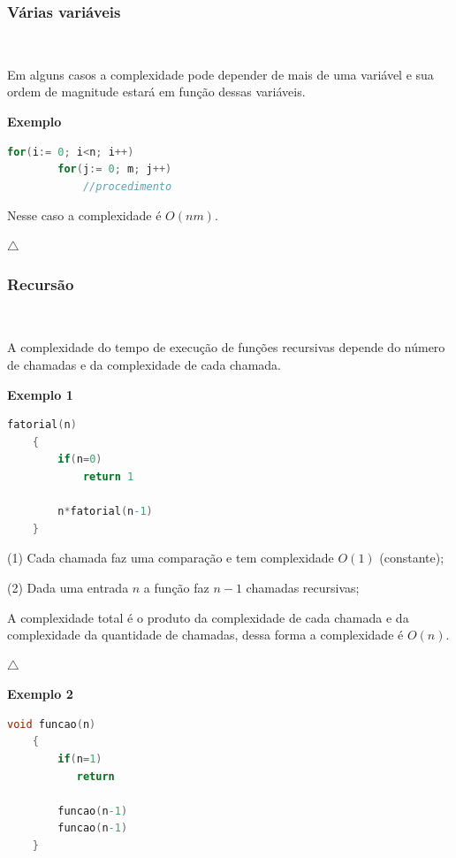 \subsubsection{Várias variáveis}
\

Em alguns casos a complexidade pode depender de mais de uma variável e sua ordem de magnitude estará em função dessas variáveis.

\textbf{Exemplo}  

\begin{lstlisting}[language=C, frame=single]
    for(i:= 0; i<n; i++)
        for(j:= 0; m; j++)
            //procedimento
\end{lstlisting}

Nesse caso a complexidade é $O(nm)$.

{\raggedleft $\bigtriangleup$ \par}

\subsubsection{Recursão}
\

A complexidade do tempo de execução de funções recursivas depende do número de chamadas e da complexidade de cada chamada.

\textbf{Exemplo 1} 

\begin{lstlisting}[language=C, frame=single]
    fatorial(n)
    {
        if(n=0)
            return 1

        n*fatorial(n-1)
    }
\end{lstlisting}

(1) Cada chamada faz uma comparação e tem complexidade $O(1)$ (constante);

(2) Dada uma entrada $n$ a função faz $n-1$ chamadas recursivas;

A complexidade total é o produto da complexidade de cada chamada e da complexidade da quantidade de chamadas, dessa forma a complexidade é $O(n)$.


{\raggedleft $\bigtriangleup$ \par}

\textbf{Exemplo 2} 

\begin{lstlisting}[language=C, frame=single]
    void funcao(n)
    {
        if(n=1)
           return

        funcao(n-1)
        funcao(n-1)
    }
\end{lstlisting}

